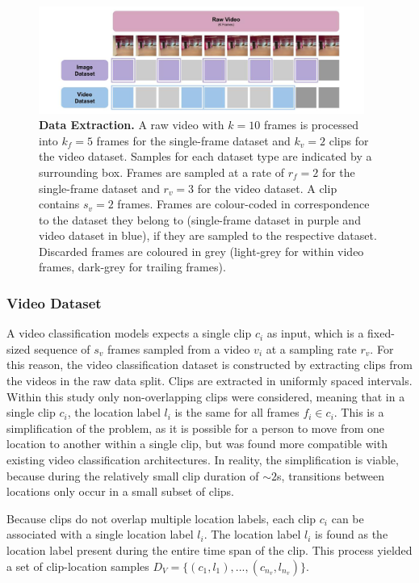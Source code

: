 \documentclass[a4paper]{article}
\begin{document}
\begin{figure}
\centering
\includegraphics[width=0.95\textwidth]{figures/data-extraction.png}
\caption{
  \textbf{Data Extraction.} A raw video with $k=10$ frames is processed into
  $k_f=5$ frames for the single-frame dataset and $k_v=2$ clips for the
  video dataset. Samples for each dataset type are indicated by a
  surrounding box. Frames are sampled at a rate of $r_f=2$ for the
  single-frame dataset and $r_v=3$ for the video dataset. A clip contains
  $s_v=2$ frames. Frames are colour-coded in correspondence to the dataset
  they belong to (single-frame dataset in purple and video dataset in blue),
  if they are sampled to the respective dataset. Discarded frames are
  coloured in grey (light-grey for within video frames, dark-grey for
  trailing frames).}
\label{fig:data-extraction}
\end{figure}


\subsubsection{Video Dataset} %

A video classification models expects a single clip $c_i$ as input, which is a
fixed-sized sequence of $s_v$ frames sampled from a video $v_i$ at a sampling
rate $r_v$. For this reason, the video classification dataset is constructed by
extracting clips from the videos in the raw data split. Clips are extracted in
uniformly spaced intervals. Within this study only non-overlapping clips were
considered, meaning that in a single clip $c_i$, the location label $l_i$ is the
same for all frames $f_i \in c_i$. This is a simplification of the problem, as
it is possible for a person to move from one location to another within a single
clip, but was found more compatible with existing video classification
architectures. In reality, the simplification is viable, because during the
relatively small clip duration of $\sim 2$s, transitions between locations only
occur in a small subset of clips.

Because clips do not overlap multiple location labels, each clip $c_i$ can be
associated with a single location label $l_i$. The location label $l_i$ is found
as the location label present during the entire time span of the clip. This
process yielded a set of clip-location samples $D_V = \{(c_1, l_1), ...,
(c_{n_v}, l_{n_v})\}$.
\end{document}
